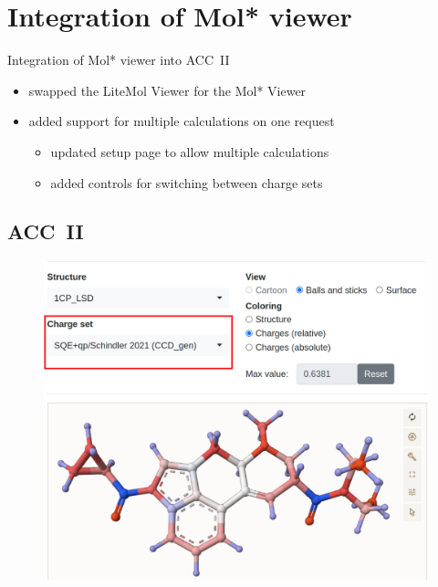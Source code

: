 \documentclass[
]{beamer}
\begin{document}
\section[Integration of Mol* viewer]{Integration of Mol* viewer}

\begin{frame}{Integration of Mol* viewer into ACC~II}
  \begin{itemize}
    \item swapped the LiteMol Viewer for the Mol* Viewer
    \item added support for multiple calculations on one request
    \begin{itemize}
      \item updated setup page to allow multiple calculations
      \item added controls for switching between charge sets
    \end{itemize}
  \end{itemize}
\end{frame}

\subsection[ACC~II]{ACC~II}

\begin{frame}
  \begin{figure}
    \includegraphics[width=1\textwidth,height=\textheight,keepaspectratio]{images/acc2.png}
  \end{figure}
\end{frame}
\end{document}

